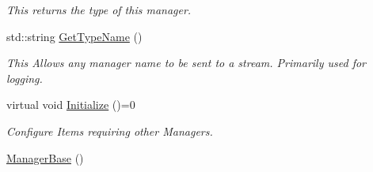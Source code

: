 \begin{DoxyCompactItemize}
\begin{DoxyCompactList}\small\item\em This returns the type of this manager. \item\end{DoxyCompactList}\item 
std::string \hyperlink{classMezzanine_1_1ManagerBase_afb2572589f8389155be7ce256c751d81}{GetTypeName} ()
\begin{DoxyCompactList}\small\item\em This Allows any manager name to be sent to a stream. Primarily used for logging. \item\end{DoxyCompactList}\item 
virtual void \hyperlink{classMezzanine_1_1ManagerBase_a864e3cac11928a602c1db28fa2d52ee2}{Initialize} ()=0
\begin{DoxyCompactList}\small\item\em Configure Items requiring other Managers. \item\end{DoxyCompactList}\item 
\hypertarget{classMezzanine_1_1ManagerBase_a6ee3249f71f330394e81e349370d57a8}{
\hyperlink{classMezzanine_1_1ManagerBase_a6ee3249f71f330394e81e349370d57a8}{ManagerBase} ()}
\label{classMezzanine_1_1ManagerBase_a6ee3249f71f330394e81e349370d57a8}


\end{DoxyCompactItemize}
